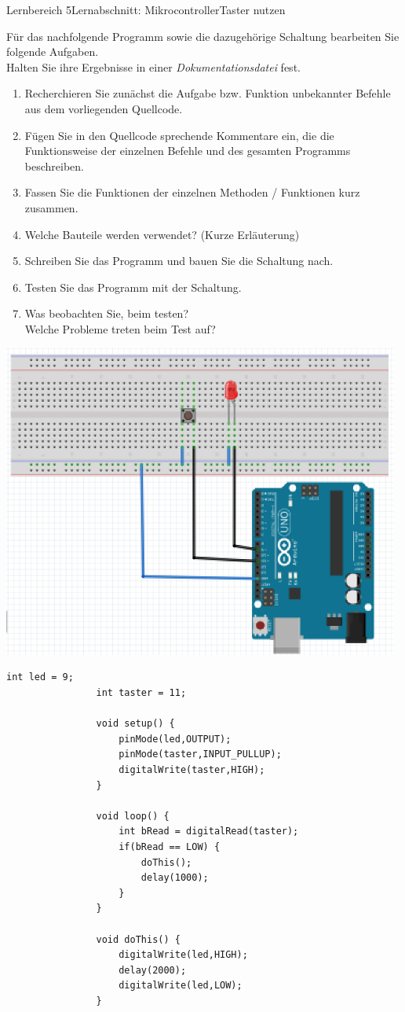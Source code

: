\documentclass[oneside,openany,headings=optiontotoc,11pt,numbers=noenddot]{scrreprt}
\begin{document}
		\begin{worksheet}{Lernbereich 5}{Lernabschnitt: Mikrocontroller}{Taster nutzen}
			\begin{framed}
				\noindent
				Für das nachfolgende Programm sowie die dazugehörige Schaltung bearbeiten Sie folgende Aufgaben.\\
				Halten Sie ihre Ergebnisse in einer \textit{Dokumentationsdatei} fest.
				\begin{enumerate}
					\item Recherchieren Sie zunächst die Aufgabe bzw. Funktion unbekannter Befehle aus dem vorliegenden Quellcode.
					\item Fügen Sie in den Quellcode sprechende Kommentare ein, die die Funktionsweise der einzelnen Befehle und des gesamten Programms beschreiben.
					\item Fassen Sie die Funktionen der einzelnen Methoden / Funktionen kurz zusammen.
					\item Welche Bauteile werden verwendet? (Kurze Erläuterung)
					\item Schreiben Sie das Programm und bauen Sie die Schaltung nach.
					\item Testen Sie das Programm mit der Schaltung.
					\item Was beobachten Sie, beim testen?\\
					Welche Probleme treten beim Test auf?
				\end{enumerate}
				\includegraphics[width=0.98\textwidth]{../99_Bilder/20191205_1.png}
			\end{framed}
			\begin{lstlisting}[style=Arduino]
				int led = 9;
				int taster = 11;
				
				void setup() {
					pinMode(led,OUTPUT);
					pinMode(taster,INPUT_PULLUP);
					digitalWrite(taster,HIGH);
				}
				
				void loop() {
					int bRead = digitalRead(taster);
					if(bRead == LOW) {
						doThis();
						delay(1000);
					}
				}
				
				void doThis() {
					digitalWrite(led,HIGH);
					delay(2000);
					digitalWrite(led,LOW);
				}
			\end{lstlisting}
		\end{worksheet}
\end{document}
